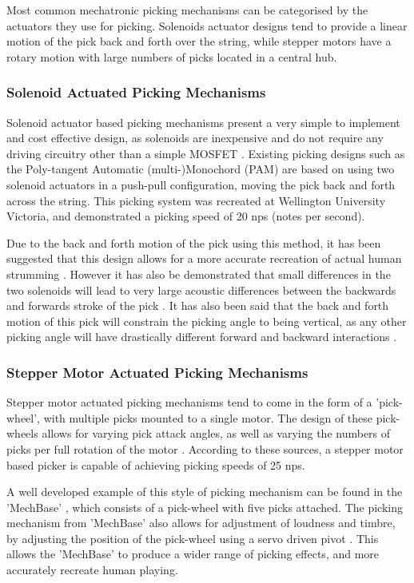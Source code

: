 \documentclass[a4paper,11pt]{article}
\begin{document}
 Most common mechatronic picking mechanisms can be categorised by the actuators they use for picking. Solenoids actuator designs tend to provide a linear motion of the pick back and forth over the string, while stepper motors have a rotary motion with large numbers of picks located in a central hub. 

\subsubsection{Solenoid Actuated Picking Mechanisms}

Solenoid actuator based picking mechanisms present a very simple to implement and cost effective design, as solenoids are inexpensive and do not require any driving circuitry other than a simple MOSFET \cite{Kapur2011ACO}. Existing picking designs such as the Poly-tangent Automatic (multi-)Monochord (PAM) \cite{Rogers} are based on using two solenoid actuators in a push-pull configuration, moving the pick back and forth across the string. This picking system was recreated at Wellington University Victoria, and demonstrated a picking speed of 20 nps (notes per second).

Due to the back and forth motion of the pick using this method, it has been suggested that this design allows for a more accurate recreation of actual human strumming \cite{Placencia2020}. However it has also be demonstrated that small differences in the two solenoids will lead to very large acoustic differences between the backwards and forwards stroke of the pick \cite{Kapur2011ACO}. It has also been said that the back and forth motion of this pick will constrain the picking angle to being vertical, as any other picking angle will have drastically different forward and backward interactions \cite{Carnegie2020}. 

\subsubsection{Stepper Motor Actuated Picking Mechanisms}

Stepper motor actuated picking mechanisms tend to come in the form of a 'pick-wheel', with multiple picks mounted to a single motor. The design of these pick-wheels allows for varying pick attack angles, as well as varying the numbers of picks per full rotation of the motor \cite{YepezPlacencia2020, Carnegie2020}. According to these sources, a stepper motor based picker is capable of achieving picking speeds of 25 nps.

A well developed example of this style of picking mechanism can be found in the 'MechBase' \cite{McVay2015}, which consists of a pick-wheel with five picks attached. The picking mechanism from 'MechBase' also allows for adjustment of loudness and timbre, by adjusting the position of the pick-wheel using a servo driven pivot \cite{Carnegie2020}. This allows the 'MechBase' to produce a wider range of picking effects, and more accurately recreate human playing. 
\end{document}
